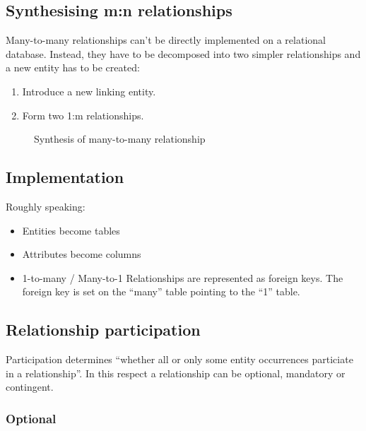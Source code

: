 \documentclass[slides]{pgnotes}
\begin{document}
\subsection{Synthesising m:n
relationships}\label{synthesising-mn-relationships}

Many-to-many relationships can't be directly implemented on a relational
database. Instead, they have to be decomposed into two simpler
relationships and a new entity has to be created:

\begin{enumerate}
\def\labelenumi{\arabic{enumi}.}
\item
  Introduce a new linking entity.
\item
  Form two 1:m relationships.
\end{enumerate}

\begin{figure}[htbp]
\centering
\caption{Synthesis of many-to-many relationship{}}
\end{figure}

\subsection{Implementation}\label{implementation}

Roughly speaking:

\begin{itemize}
\item
  Entities become tables
\item
  Attributes become columns
\item
  1-to-many / Many-to-1 Relationships are represented as foreign keys.
  The foreign key is set on the ``many'' table pointing to the ``1''
  table.
\end{itemize}

\subsection{Relationship
participation}\label{relationship-participation}

Participation determines ``whether all or only some entity occurrences
particiate in a relationship''. In this respect a relationship can be
optional, mandatory or contingent.

\subsubsection{Optional}\label{optional}
\end{document}
